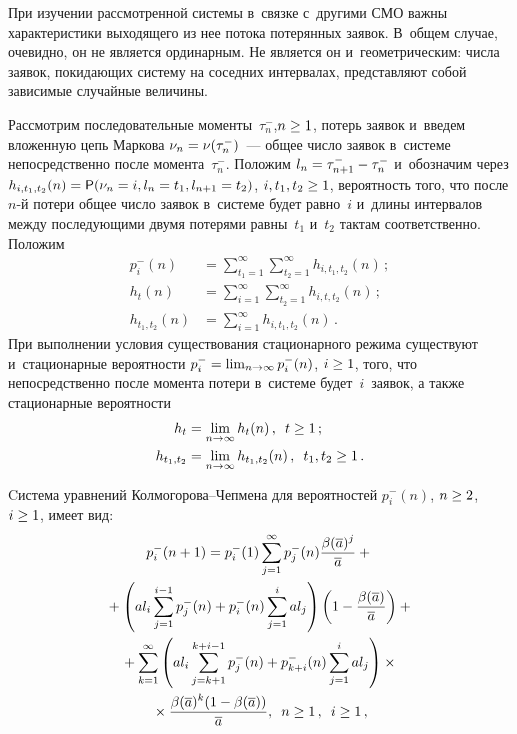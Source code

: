 \begin{multicols}{2}
При изучении рассмотренной системы в~связке с~другими СМО
важны характеристики выходящего из нее потока потерянных заявок.
В~общем случае, очевидно, он не является ординарным.
Не является он и~геометрическим:
числа заявок, покидающих систему на соседних интервалах,
представляют собой зависимые случайные величины.


Рассмотрим последовательные моменты~$\tau^-_n$,\linebreak $n\hm\ge 1$,
потерь заявок и~введем вложенную цепь Маркова
$\nu_n\hm=\nu(\tau^-_n)$~--- общее число заявок в~системе
непосредственно после момента~$\tau^-_n$.
Положим $l_n\hm=\tau^-_{n+1}-\tau^-_n$
и~обозначим через ${h_{i,t_1,t_2}(n)\hm={\sf P} (\nu_n\hm=i, l_n\hm=t_1, 
l_{n+1}\hm=t_2)}$, $i, t_1,t_2 \hm\ge 1$,
вероятность того, что после $n$-й потери общее число заявок в~системе 
будет равно~$i$ и~длины интервалов между последующими двумя потерями 
равны~$t_1$ и~$t_2$ тактам соответственно. 
Положим
\begin{align*}
p_i^-(n)&=\sum\limits_{t_1=1}^\infty \sum\limits_{t_2=1}^\infty h_{i,t_1,t_2}(n)\,;\\
h_{t}(n)&=\sum\limits_{i=1}^\infty\sum\limits_{t_2=1}^\infty 
h_{i,t,t_2}(n)\,;\\
h_{t_1,t_2}(n)&=\sum\limits_{i=1}^\infty h_{i,t_1,t_2}(n)\,.
\end{align*}
При выполнении условия существования стационарного режима
существуют и~стационарные вероятности
$p_i^-\hm=\lim\nolimits_{n \rightarrow \infty } p_i^-(n)$, $i\hm\ge 1$, 
того,
что непосредственно после момента потери в~системе будет~$i$~заявок,
а также стационарные вероятности
\begin{align*}
h_{t}&=\lim\limits_{n \rightarrow \infty } h_{t}(n)\,,\enskip t \hm\ge 1\,;\\
h_{t_1,t_2}&=\lim\limits_{n \rightarrow \infty } h_{t_1,t_2}(n)\,,\enskip 
t_1,t_2 \hm\ge 1\,.
\end{align*}

Cистема уравнений Колмогорова--Чепмена для вероятностей $p_i^-(n)$, $n 
\hm\ge 2$, $i \hm\ge 1$, имеет вид:
\begin{multline}
p_i^-(n+1)=p_i^-(1)\sum\limits_{j=1}^\infty
p_j^-(n) \displaystyle\frac{\displaystyle \beta(\overline{a})^j\mathstrut}{\displaystyle \overline{a}\mathstrut}+{}\\
{}+\left(al_i \sum\limits_{j=1}^{i-1}
p_j^-(n) +p_i^-(n)\sum\limits_{j=1}^{i}al_j\right)
\left( 1-\displaystyle\frac{\displaystyle \beta(\overline{a}) \mathstrut}{\displaystyle \overline{a}\mathstrut}\right)+{}
\\
{}+
\sum\limits_{k=1}^\infty
\left(
al_i \sum\limits_{j=k+1}^{k+i-1}
p_j^-(n) +
p_{k+i}^-(n) \sum\limits_{j=1}^{i}
al_j \right)\times{}\\
{}\times
\displaystyle\frac{\displaystyle \beta(\overline{a})^k (1-\beta(\overline{a})) \mathstrut}{\displaystyle \overline{a}\mathstrut}, 
\enskip n \ge 1\,, \enskip i \ge 1\,,
\label{loss1}
\end{multline}


\end{multicols}
